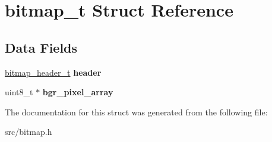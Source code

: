 \hypertarget{structbitmap__t}{\section{bitmap\+\_\+t Struct Reference}
\label{structbitmap__t}
}
\subsection*{Data Fields}
\begin{DoxyCompactItemize}
\item 
\hypertarget{structbitmap__t_abb139c0d629acfd6b342b313f481ab88}{\hyperlink{structbitmap__header__t}{bitmap\+\_\+header\+\_\+t} {\bfseries header}}\label{structbitmap__t_abb139c0d629acfd6b342b313f481ab88}

\item 
\hypertarget{structbitmap__t_a2a549bd10cc32dbfea650d458aa2f7f5}{uint8\+\_\+t $\ast$ {\bfseries bgr\+\_\+pixel\+\_\+array}}\label{structbitmap__t_a2a549bd10cc32dbfea650d458aa2f7f5}

\end{DoxyCompactItemize}


The documentation for this struct was generated from the following file\+:\begin{DoxyCompactItemize}
\item 
src/bitmap.\+h\end{DoxyCompactItemize}
